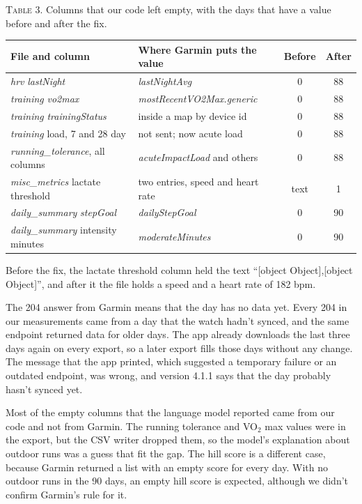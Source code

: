 \documentclass[11pt]{article}
\newcommand\code[1]{\textit{#1}}
\begin{document}
\begin{center}\footnotesize
\textsc{Table 3.} Columns that our code left empty, with the days that have a value before and after the fix.\par\smallskip
\begin{tabular}{@{}llcc@{}}
\toprule
File and column & Where Garmin puts the value & Before & After \\
\midrule
\code{hrv} \code{lastNight} & \code{lastNightAvg} & 0 & 88 \\
\code{training} \code{vo2max} & \code{mostRecentVO2Max.generic} & 0 & 88 \\
\code{training} \code{trainingStatus} & inside a map by device id & 0 & 88 \\
\code{training} load, 7 and 28 day & not sent; now acute load & 0 & 88 \\
\code{running\_tolerance}, all columns & \code{acuteImpactLoad} and others & 0 & 88 \\
\code{misc\_metrics} lactate threshold & two entries, speed and heart rate & text & 1 \\
\code{daily\_summary} \code{stepGoal} & \code{dailyStepGoal} & 0 & 90 \\
\code{daily\_summary} intensity minutes & \code{moderateMinutes} & 0 & 90 \\
\bottomrule
\end{tabular}
\end{center}

\noindent Before the fix, the lactate threshold column held the text ``[object Object],[object Object]'', and after it the file holds a speed and a heart rate of 182 bpm.

 The 204 answer from Garmin means that the day has no data yet. Every 204 in our measurements came from a day that the watch hadn't synced, and the same endpoint returned data for older days. The app already downloads the last three days again on every export, so a later export fills those days without any change. The message that the app printed, which suggested a temporary failure or an outdated endpoint, was wrong, and version 4.1.1 says that the day probably hasn't synced yet.

Most of the empty columns that the language model reported came from our code and not from Garmin. The running tolerance and VO$_2$ max values were in the export, but the CSV writer dropped them, so the model's explanation about outdoor runs was a guess that fit the gap. The hill score is a different case, because Garmin returned a list with an empty score for every day. With no outdoor runs in the 90 days, an empty hill score is expected, although we didn't confirm Garmin's rule for it.
\end{document}
